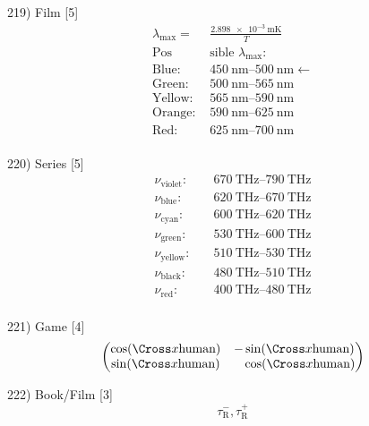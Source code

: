 \documentclass[10pt]{article}
\begin{document}
  219) Film [5]
  \[
    \begin{split}
      \lambda_\text{max} =&\frac{\SI{2.898e-3}{\metre\kelvin}}{T} \\
      \text{Pos} &\text{sible } \lambda_\text{max}: \\
      \text{Blue: } & \SI{450}{\nano\metre}\text{--}\SI{500}{\nano\metre} \leftarrow \\
      \text{Green: } & \SI{500}{\nano\metre}\text{--}\SI{565}{\nano\metre} \\
      \text{Yellow: } & \SI{565}{\nano\metre}\text{--}\SI{590}{\nano\metre} \\
      \text{Orange: } & \SI{590}{\nano\metre}\text{--}\SI{625}{\nano\metre} \\
      \text{Red: } & \SI{625}{\nano\metre}\text{--}\SI{700}{\nano\metre} \\
    \end{split}
  \]

  220) Series [5]
  \[
    \begin{split}
      \nu_\text{violet}:\quad&\SI{670}{\tera\hertz}\text{--}\SI{790}{\tera\hertz}\\
      \nu_\text{blue}: \quad& \SI{620}{\tera\hertz}\text{--}\SI{670}{\tera\hertz} \\
      \nu_\text{cyan}: \quad& \SI{600}{\tera\hertz}\text{--}\SI{620}{\tera\hertz} \\
			\nu_\text{green}: \quad& \SI{530}{\tera\hertz}\text{--}\SI{600}{\tera\hertz} \\
      \nu_\text{yellow}: \quad& \SI{510}{\tera\hertz}\text{--}\SI{530}{\tera\hertz} \\
      \nu_\text{black}: \quad& \SI{480}{\tera\hertz}\text{--}\SI{510}{\tera\hertz} \\
      \nu_\text{red}: \quad& \SI{400}{\tera\hertz}\text{--}\SI{480}{\tera\hertz} \\
    \end{split}
  \]

  221) Game [4]
  \[
    \begin{pmatrix}
      \cos(\text{\Cross}    x\text{human}) & - \sin(\text{\Cross}    x\text{human}) \\
      \sin(\text{\Cross}    x\text{human}) & \phantom{-}\cos(\text{\Cross}    x\text{human}) \\
    \end{pmatrix}
  \]

  222) Book/Film [3]
  \[
    \tau^-_\text{R}, \tau^+_\text{R} 
  \]
  
\end{document}
